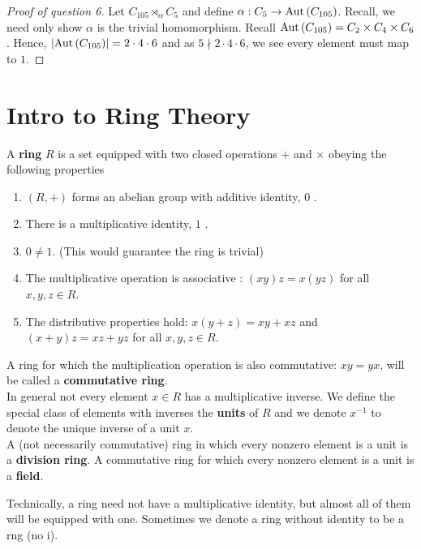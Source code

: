 \begin{proof}[Proof of question 6]
	Let \(C_{105} \rtimes_{\alpha} C_5\) 	and define \(\alpha: C_5 \to \operatorname{Aut}\left( C_{105} \right) \). Recall, we need only show \(\alpha\) is the trivial homomorphism. Recall \( \operatorname{Aut}\left( C_{105} \right) = C_2 \times C_4 \times C_6  \). Hence, \(\left| \operatorname{Aut}\left( C_{105} \right)  \right| = 2 \cdot 4 \cdot 6 \) and as \(5 \nmid 2 \cdot 4 \cdot 6\), we see every element must map to \(1\).
\end{proof}
\section{Intro to Ring Theory}
\begin{definition}[Ring]
A \textbf{ring} \(R\) is a set equipped with two closed operations \(+\) and \(\times\) obeying the following properties
\begin{enumerate}
	\item \((R, +)\) forms an abelian group with additive identity, \(0\) .
	\item There is a multiplicative identity, \(1\) .
	\item \(0 \neq 1\). (This would guarantee the ring is trivial)
	\item The multiplicative operation is associative : \(\left( xy \right) z = x\left(yz  \right) \) for all \(x, y, z \in R\).
	\item The distributive properties hold: \(x\left( y+z \right) = xy + xz\) and \(\left( x + y \right) z = xz + yz\) for all \(x, y, z \in R\).
\end{enumerate}
A ring for which the multiplication operation is also commutative: \(xy = yx\), will be called a \textbf{commutative ring}.\\
	In general not every element \(x \in R\) has a multiplicative inverse. We define the special class of elements with inverses the \textbf{units} of \(R\) and we denote \(x^{-1}\) to denote the unique inverse of a unit \(x\).\\
	A (not necessarily commutative) ring in which every nonzero element is a unit is a \textbf{division ring}.
	A commutative ring for which every nonzero element is a unit is a \textbf{field}.
\end{definition}
\begin{remark}
	Technically, a ring need not have a multiplicative identity, but almost all of them will be equipped with one. Sometimes we denote a ring without identity to be a rng (no i).
\end{remark}
\begin{example}

\end{example}
